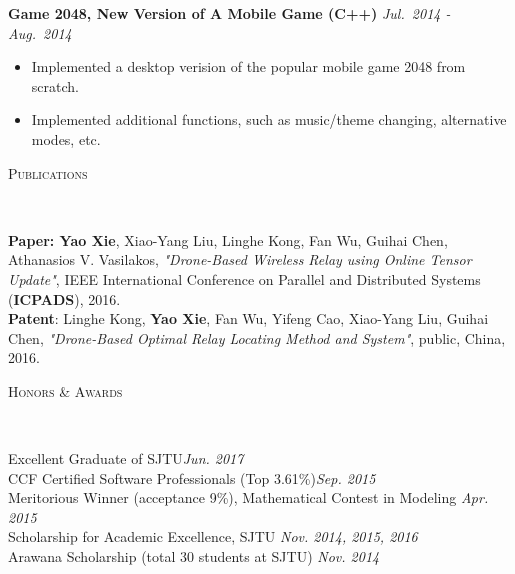 \documentclass[10pt]{article}
\newenvironment{changemargin}[2]{%
  \begin{list}{}{%
    \setlength{\topsep}{0pt}%
    \setlength{\leftmargin}{#1}%
    \setlength{\rightmargin}{#2}%
    \setlength{\listparindent}{\parindent}%
    \setlength{\itemindent}{\parindent}%
    \setlength{\parsep}{\parskip}%
  }%
  \item[]}{\end{list}
}
\newcommand{\lineover}{
	\begin{changemargin}{-0.05in}{-0.05in}
		\vspace*{-8pt}
		\hrulefill \\
		\vspace*{-2pt}
	\end{changemargin}
}
\newcommand{\header}[1]{
	\begin{changemargin}{-0.7in}{-0.65in}
		\scshape{\large{#1}}\\
  	\lineover
	\end{changemargin}
}
\newenvironment{body} {
	\vspace*{-16pt}
	\begin{changemargin}{-0.65in}{-0.62in}
  }	
	{\end{changemargin}
}
\begin{document}
\begin{body}


	\textbf{Game 2048, New Version of A Mobile Game (C++)} \hfill \emph{Jul.~2014 - {Aug.}~2014}\\
	\vspace*{-5pt}
	\begin{itemize} \itemsep -0pt 
		\item Implemented a desktop verision of the popular mobile game 2048 from scratch.
		\item Implemented additional functions, such as music/theme changing, alternative modes, etc.
	\end{itemize} 
	

	
\end{body}

\smallskip
\vspace{-8pt}

\header{Publications}

\begin{body}
	\vspace{14pt}
	
\textbf{Paper: Yao Xie}, Xiao-Yang Liu, Linghe Kong, Fan Wu, Guihai Chen, Athanasios V. Vasilakos, \textit{"Drone-Based Wireless Relay using Online Tensor Update"}, IEEE International Conference on Parallel and Distributed Systems (\textbf{ICPADS}), 2016.\\
\textbf{Patent}: Linghe Kong, \textbf{Yao Xie}, Fan Wu, Yifeng Cao, Xiao-Yang Liu, Guihai Chen, \textit{"Drone-Based Optimal Relay Locating Method and System"}, public, China, 2016.

\end{body}

\smallskip
\smallskip
\vspace{-8pt}

\header{Honors \& Awards}

\begin{body}
	\vspace{14pt}

	Excellent Graduate of SJTU\hfill \emph{Jun. 2017}\\
	
	CCF Certified Software Professionals (Top 3.61\%)\hfill \emph{Sep. 2015}\\


	Meritorious Winner (acceptance 9\%), Mathematical Contest in Modeling  \hfill  \emph{Apr. 2015}\\
	
	Scholarship for Academic Excellence, SJTU \hfill \emph{Nov. 2014, 2015, 2016}\\
	
	Arawana Scholarship (total 30 students at SJTU) \hfill \emph{Nov. 2014}
	

\end{body}
\end{document}
